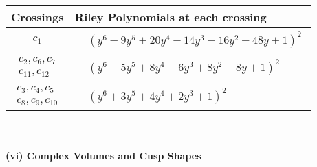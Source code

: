\documentclass[1p]{elsarticle_modified}
\theoremstyle{definition}
\begin{document}
\begin{tabular}{m{50pt}|m{274pt}}
Crossings & \hspace{64pt}Riley Polynomials at each crossing \\
\hline $$\begin{aligned}c_{1}\end{aligned}$$&$\begin{aligned}
&(y^6-9 y^5+20 y^4+14 y^3-16 y^2-48 y+1)^2
\end{aligned}$\\
\hline $$\begin{aligned}c_{2},c_{6},c_{7}\\c_{11},c_{12}\end{aligned}$$&$\begin{aligned}
&(y^6-5 y^5+8 y^4-6 y^3+8 y^2-8 y+1)^2
\end{aligned}$\\
\hline $$\begin{aligned}c_{3},c_{4},c_{5}\\c_{8},c_{9},c_{10}\end{aligned}$$&$\begin{aligned}
&(y^6+3 y^5+4 y^4+2 y^3+1)^2
\end{aligned}$\\
\hline
\end{tabular}\\~\\
\newpage\flushleft \textbf{(vi) Complex Volumes and Cusp Shapes}
\end{document}

